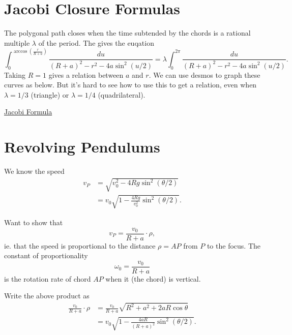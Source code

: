 \documentclass{ximera}
\begin{document}
\section*{Jacobi Closure Formulas}

The polygonal path closes when the time subtended by the chords is a rational multiple $\lambda$ of the period. The gives the euqation
\[
     \int_0^{\arccos(\frac{r}{R+a})} \frac{du}{(R+a)^2 - r^2 - 4a\sin^2(u/2)} = \lambda \int_0^{2\pi} \frac{du}{(R+a)^2 - r^2 - 4a\sin^2(u/2)} .
\]
Taking $R=1$ gives a relation between $a$ and $r$. We can use desmos to graph these curves as below. But it's hard to see how to use this to get a relation, even when $\lambda=1/3$ (triangle) or $\lambda  = 1/4$ (quadrilateral).


\begin{onlineOnly}
    \begin{center}
\end{center}
\end{onlineOnly}

\href{https://www.desmos.com/calculator/wnef0tpllt}{Jacobi Formula}



\section*{Revolving Pendulums}

We know the speed
\begin{align*}
    v_P &= \sqrt{v_0^2-4Rg \sin^2 (\theta/2)}  \\
           &=v_0 \sqrt{1-\frac{4Rg}{v_0^2} \sin^2 (\theta/2)} .
\end{align*}

Want to show that 
\[
    v_P = \frac{v_0}{R+a} \cdot \rho ,
\]
ie. that the speed is proportional to the distance $\rho = AP$ from $P$ to the focus. The constant of proportionality
\[
           \omega_0 = \frac{v_0}{R+a}
\]
is the rotation rate of chord $AP$ when it (the chord) is vertical.

Write the above product as
\begin{align*}
   \frac{v_0}{R+a} \cdot \rho  &= \frac{v_0}{R+a} \sqrt{R^2 + a^2 + 2aR \cos\theta} \\
                                         &= v_0 \sqrt{1 - \frac{4aR}{(R+a)^2} \sin^2 (\theta/2)} .
\end{align*}
\end{document}
